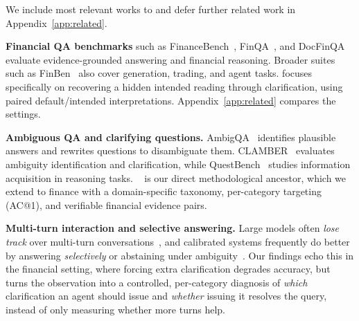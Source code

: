 We include most relevant works to \fininteract and defer further related work in Appendix~\ref{app:related}.

\textbf{Financial QA benchmarks} such as FinanceBench~\citep{islam2023financebench}, FinQA~\citep{chen2021finqa}, and DocFinQA~\citep{reddy2024docfinqa} evaluate evidence-grounded answering and financial reasoning. Broader suites such as FinBen~\citep{xie2024finben} also cover generation, trading, and agent tasks. \fininteract focuses specifically on recovering a hidden intended reading through clarification, using paired default/intended interpretations. Appendix~\ref{app:related} compares the settings.

\textbf{Ambiguous QA and clarifying questions.} AmbigQA~\citep{min2020ambigqa} identifies plausible answers and rewrites questions to disambiguate them. CLAMBER~\citep{zhang2024clamber} evaluates ambiguity identification and clarification, while QuestBench~\citep{li2025questbench} studies information acquisition in reasoning tasks. \interactcomp~\citep{interactcomp2026} is our direct methodological ancestor, which we extend to finance with a domain-specific taxonomy, per-category targeting (AC@1), and verifiable financial evidence pairs.

\textbf{Multi-turn interaction and selective answering.} Large models often \emph{lose track} over multi-turn conversations~\citep{laban2026llms}, and calibrated systems frequently do better by answering \emph{selectively} or abstaining under ambiguity~\citep{cole2023selectively,kuhn2022clam}. Our findings echo this in the financial setting, where forcing extra clarification degrades accuracy, but \fininteract turns the observation into a controlled, per-category diagnosis of \emph{which} clarification an agent should issue and \emph{whether} issuing it resolves the query, instead of only measuring whether more turns help.
